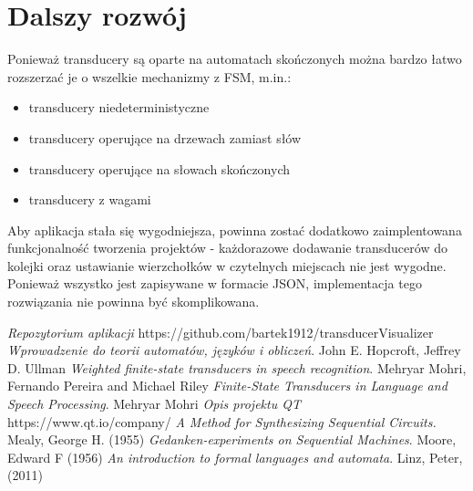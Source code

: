 \documentclass[declaration,shortabstract]{iithesis}
\theoremstyle{definition}
\theoremstyle{plain}
\begin{document}
\section{Dalszy rozwój}
Ponieważ transducery są oparte na automatach skończonych można bardzo łatwo rozszerzać je o wszelkie mechanizmy z FSM, m.in.:
\begin{itemize}
\item transducery niedeterministyczne
\item transducery operujące na drzewach zamiast słów
\item transducery operujące na słowach skończonych
\item transducery z wagami
\end{itemize}
Aby aplikacja stała się wygodniejsza, powinna zostać dodatkowo zaimplentowana funkcjonalność tworzenia projektów - każdorazowe dodawanie transducerów do kolejki oraz ustawianie wierzchołków w czytelnych miejscach nie jest wygodne. Ponieważ wszystko jest zapisywane w formacie JSON, implementacja tego rozwiązania nie powinna być skomplikowana.

\begin{thebibliography}{10}
 \emph{Repozytorium aplikacji} https://github.com/bartek1912/transducerVisualizer
 \emph{Wprowadzenie do teorii automatów, języków i obliczeń}. John E. Hopcroft, Jeffrey D. Ullman
 \emph{Weighted finite-state transducers in speech recognition}. Mehryar Mohri, Fernando Pereira and Michael Riley
 \emph{Finite-State Transducers in Language and Speech Processing}. Mehryar Mohri
 \emph{Opis projektu QT} https://www.qt.io/company/
 \emph{A Method for Synthesizing Sequential Circuits.} Mealy, George H. (1955)
 \emph{Gedanken-experiments on Sequential Machines}. Moore, Edward F (1956)
\emph{An introduction to formal languages and automata}.
  Linz, Peter, (2011)
\end{thebibliography}
\end{document}

